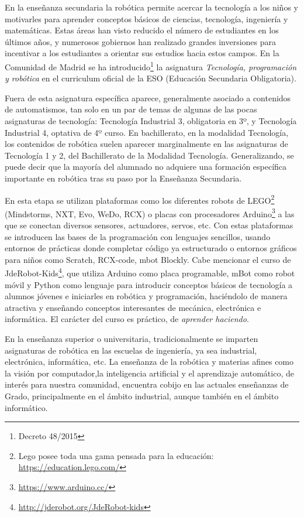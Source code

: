 En la enseñanza secundaria la robótica permite acercar la tecnología a los niños y motivarles para aprender conceptos básicos de ciencias, tecnología, ingeniería y matemáticas. Estas áreas han visto reducido el número de estudiantes en los últimos años, y numerosos gobiernos han realizado grandes inversiones para incentivar a los estudiantes a orientar sus estudios hacia estos campos. En la Comunidad de Madrid se ha introducido\footnote{Decreto 48/2015} la asignatura \textit{Tecnología, programación y robótica} en el curriculum oficial de la ESO (Educación Secundaria Obligatoria). 

Fuera de esta asignatura específica aparece, generalmente asociado a contenidos de automatismos, tan solo en un par de temas de algunas de las pocas asignaturas de tecnología: Tecnología Industrial 3, obligatoria en 3º, y Tecnología Industrial 4, optativa de 4º curso. En bachillerato, en la modalidad Tecnología, los contenidos de robótica suelen aparecer marginalmente en las asignaturas de Tecnología 1 y 2, del Bachillerato de la Modalidad Tecnología. Generalizando, se puede decir que la mayoría del alumnado no adquiere una formación específica importante en robótica tras su paso por la Enseñanza Secundaria. 

En esta etapa se utilizan plataformas como los diferentes robots de LEGO\footnote{Lego posee toda una gama pensada para la educación: \url{https://education.lego.com/}} (Mindstorms, NXT, Evo, WeDo, RCX) o placas con procesadores Arduino\footnote{\url{https://www.arduino.cc/}} a las que se conectan diversos sensores, actuadores, servos, etc. Con estas plataformas se introducen las bases de la programación con lenguajes sencillos, usando entornos de prácticas donde completar código ya estructurado o entornos gráficos para niños como Scratch, RCX-code, mbot Blockly. Cabe mencionar el curso de JdeRobot-Kids\footnote{\url{http://jderobot.org/JdeRobot-kids}}, que utiliza Arduino como placa programable, mBot como robot móvil y Python como lenguaje para introducir conceptos básicos de tecnología a alumnos jóvenes e iniciarles en robótica y programación, haciéndolo de manera atractiva y enseñando conceptos interesantes de mecánica, electrónica e informática. El carácter del curso es práctico, de \textit{aprender haciendo}.

En la enseñanza superior o universitaria, tradicionalmente se imparten asignaturas de robótica en las escuelas de ingeniería, ya sea industrial, electrónica, informática, etc. La enseñanza de la robótica y materias afines como la visión por computador,la inteligencia artificial y el aprendizaje automático, de interés para nuestra comunidad, encuentra cobijo en las actuales enseñanzas de Grado, principalmente en el ámbito industrial, aunque también en el ámbito informático. 

